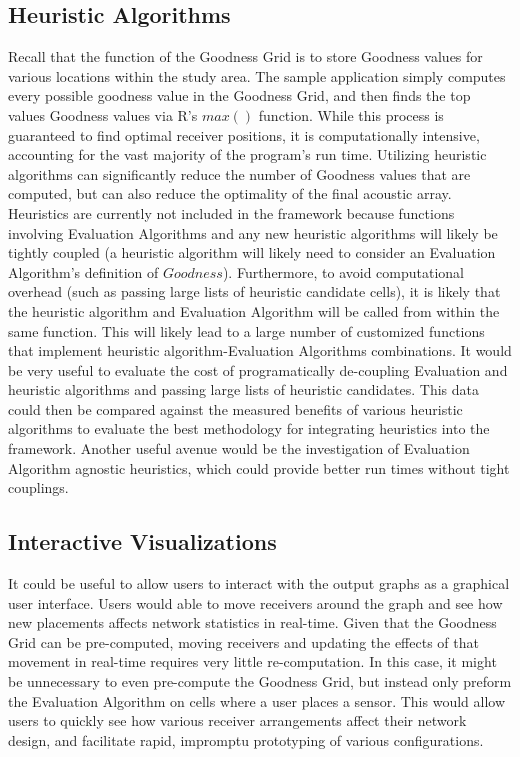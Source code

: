 \subsection{Heuristic Algorithms}
Recall that the function of the Goodness Grid is to store Goodness values for various locations within the study area.  The sample application simply computes every possible goodness value in the Goodness Grid, and then finds the top values Goodness values via R's $max()$ function.  While this process is guaranteed to find optimal receiver positions, it is computationally intensive, accounting for the vast majority of the program's run time.  Utilizing heuristic algorithms can significantly reduce the number of Goodness values that are computed, but can also reduce the optimality of the final acoustic array.  Heuristics are currently not included in the framework because functions involving Evaluation Algorithms and any new heuristic algorithms will likely be tightly coupled (a heuristic algorithm will likely need to consider an Evaluation Algorithm's definition of $Goodness$).  Furthermore, to avoid computational overhead (such as passing large lists of heuristic candidate cells), it is likely that the heuristic algorithm and Evaluation Algorithm will be called from within the same function.  This will likely lead to a large number of customized functions that implement heuristic algorithm-Evaluation Algorithms combinations.  It would be very useful to evaluate the cost of programatically de-coupling Evaluation and heuristic algorithms and passing large lists of heuristic candidates.  This data could then be compared against the measured benefits of various heuristic algorithms to evaluate the best methodology for integrating heuristics into the framework.  Another useful avenue would be the investigation of Evaluation Algorithm agnostic heuristics, which could provide better run times without tight couplings.

\subsection{Interactive Visualizations}
It could be useful to allow users to interact with the output graphs as a graphical user interface.  Users would able to move receivers around the graph and see how new placements affects network statistics in real-time.  Given that the Goodness Grid can be pre-computed, moving receivers and updating the effects of that movement in real-time requires very little re-computation.  In this case, it might be unnecessary to even pre-compute the Goodness Grid, but instead only preform the Evaluation Algorithm on cells where a user places a sensor.  This would allow users to quickly see how various receiver arrangements affect their network design, and facilitate rapid, impromptu prototyping of various configurations.  

